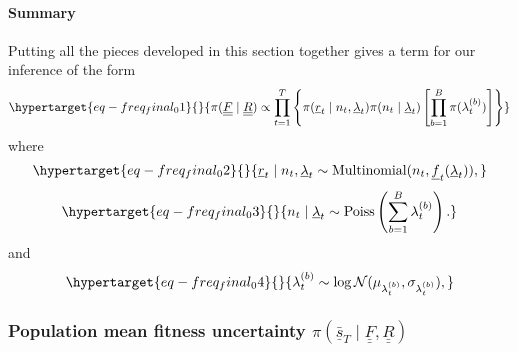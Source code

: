 \documentclass[
  letterpaper,
  DIV=11,
  numbers=noendperiod]{scrartcl}
\let\oldparagraph\paragraph
\renewcommand{\paragraph}[1]{\oldparagraph{#1}\mbox{}}
\begin{document}
\begin{refsegment}
{\paragraph{Summary}\label{summary}}

Putting all the pieces developed in this section together gives a term
for our inference of the form
\begin{equation}\protect\hypertarget{eq-freq_final_01}{}{
\pi(\underline{\underline{F}} \mid \underline{\underline{R}}) \propto
\prod_{t=1}^T\left\{
    \pi(\underline{r}_t \mid n_t, \underline{\lambda}_t)
    \pi(n_t \mid \underline{\lambda}_t)
    \left[ 
        \prod_{b=1}^B \pi(\lambda_t^{(b)})
    \right]
\right\}
}\label{eq-freq_final_01}\end{equation} where
\begin{equation}\protect\hypertarget{eq-freq_final_02}{}{
\underline{r}_t \mid n_t, \underline{\lambda}_t \sim
\operatorname{Multinomial}(n_t, \underline{f}_t(\underline{\lambda}_t)),
}\label{eq-freq_final_02}\end{equation}
\begin{equation}\protect\hypertarget{eq-freq_final_03}{}{
n_t \mid \underline{\lambda}_t \sim 
\operatorname{Poiss}\left(\sum_{b=1}^B \lambda_t^{(b)}\right).
}\label{eq-freq_final_03}\end{equation} and
\begin{equation}\protect\hypertarget{eq-freq_final_04}{}{
\lambda_t^{(b)} \sim 
\log\mathcal{N}(\mu_{\lambda_t^{(b)}}, \sigma_{\lambda_t^{(b)}}),
}\label{eq-freq_final_04}\end{equation}

\hypertarget{sec-bayes_meanfit}{%
\subsubsection{\texorpdfstring{Population mean fitness uncertainty
\(\pi(\underline{\bar{s}}_T \mid \underline{\underline{F}}, \underline{\underline{R}})\)}{Population mean fitness uncertainty \textbackslash pi(\textbackslash underline\{\textbackslash bar\{s\}\}\_T \textbackslash mid \textbackslash underline\{\textbackslash underline\{F\}\}, \textbackslash underline\{\textbackslash underline\{R\}\})}}\label{sec-bayes_meanfit}}


\end{refsegment}
\end{document}
